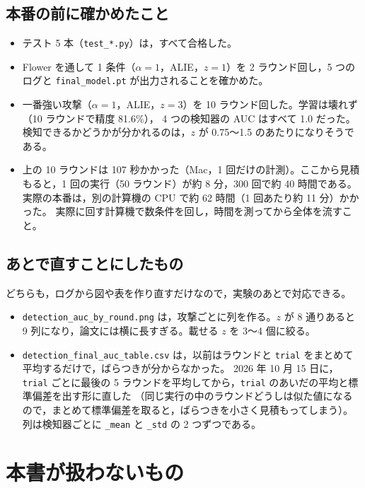 \documentclass[a4j, dvipdfmx]{jsarticle}  %
\begin{document}
\subsection{本番の前に確かめたこと}

\begin{itemize}
  \item テスト 5 本（\texttt{test\_*.py}）は，すべて合格した。
  \item Flower を通して 1 条件（$\alpha = 1$，ALIE，$z = 1$）を 2 ラウンド回し，5 つのログと \texttt{final\_model.pt} が出力されることを確かめた。
  \item 一番強い攻撃（$\alpha = 1$，ALIE，$z = 3$）を 10 ラウンド回した。学習は壊れず（10 ラウンドで精度 81.6\%），
        4 つの検知器の AUC はすべて 1.0 だった。検知できるかどうかが分かれるのは，$z$ が 0.75〜1.5 のあたりになりそうである。
  \item 上の 10 ラウンドは 107 秒かかった（Mac，1 回だけの計測）。ここから見積もると，1 回の実行（50 ラウンド）が約 8 分，300 回で約 40 時間である。実際の本番は，別の計算機の CPU で約 62 時間（1 回あたり約 11 分）かかった。
        実際に回す計算機で数条件を回し，時間を測ってから全体を流すこと。
\end{itemize}

\subsection{あとで直すことにしたもの}

どちらも，ログから図や表を作り直すだけなので，実験のあとで対応できる。
\begin{itemize}
  \item \texttt{detection\_auc\_by\_round.png} は，攻撃ごとに列を作る。$z$ が 8 通りあると 9 列になり，論文には横に長すぎる。載せる $z$ を 3〜4 個に絞る。
  \item \texttt{detection\_final\_auc\_table.csv} は，以前はラウンドと \texttt{trial} をまとめて平均するだけで，ばらつきが分からなかった。
        2026 年 10 月 15 日に，\texttt{trial} ごとに最後の 5 ラウンドを平均してから，\texttt{trial} のあいだの平均と標準偏差を出す形に直した
        （同じ実行の中のラウンドどうしは似た値になるので，まとめて標準偏差を取ると，ばらつきを小さく見積もってしまう）。
        列は検知器ごとに \texttt{\_mean} と \texttt{\_std} の 2 つずつである。
\end{itemize}

\section{本書が扱わないもの}
\end{document}
